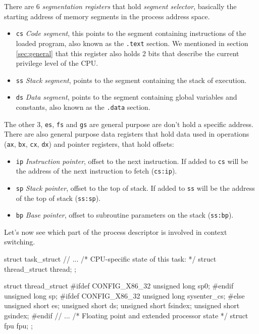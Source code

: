 There are 6 \textit{segmentation registers} that hold \textit{segment selector}, basically the starting address of memory segments in the process address space.
\begin{itemize}
    \item \verb|cs| \textit{Code segment}, this points to the segment containing instructions of the loaded program, also known as the \verb|.text| section. We mentioned in section \ref{sec:general} that this register also holds 2 bits that describe the current privilege level of the CPU.
    \item \verb|ss| \textit{Stack segment}, points to the segment containing the stack of execution.
    \item \verb|ds| \textit{Data segment}, points to the segment containing global variables and constants, also known as the \verb|.data| section.
\end{itemize}
The other 3, \verb|es|, \verb|fs| and \verb|gs| are general purpose are don't hold a specific address. There are also general purpose data registers that hold data used in operations (\verb|ax|, \verb|bx|, \verb|cx|, \verb|dx|) and pointer registers, that hold offsets:
\begin{itemize}
    \item \verb|ip| \textit{Instruction pointer}, offset to the next instruction. If added to \verb|cs| will be the address of the next instruction to fetch (\verb|cs:ip|).
    \item \verb|sp| \textit{Stack pointer}, offset to the top of stack. If added to \verb|ss| will be the address of the top of stack (\verb|ss:sp|).
    \item \verb|bp| \textit{Base pointer}, offset to subroutine parameters on the stack (\verb|ss:bp|).
\end{itemize}
Let's now see which part of the process descriptor is involved in context switching.
\begin{code}
struct task_struct {
    // ...
    /* CPU-specific state of this task: */
    struct thread_struct    thread;
};
\end{code}
\begin{code}
struct thread_struct {
#ifdef CONFIG_X86_32
    unsigned long	sp0;
#endif
    unsigned long	sp;
#ifdef CONFIG_X86_32
    unsigned long	sysenter_cs;
#else
    unsigned short	es;
    unsigned short	ds;
    unsigned short	fsindex;
    unsigned short        gsindex;
#endif
    // ...
    /* Floating point and extended processor state */
    struct fpu      fpu;
};
\end{code}

